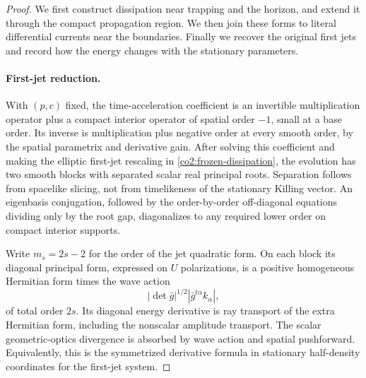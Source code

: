 \begin{proof}
We first construct dissipation near trapping and the horizon, and extend it
through the compact propagation region.  We then join these forms to literal
differential currents near the boundaries.  Finally we recover the original
first jets and record how the energy changes with the stationary parameters.

\paragraph{First-jet reduction.}
With $(p,c)$ fixed, the time-acceleration coefficient is an invertible
multiplication operator plus a compact interior operator of spatial order
$-1$, small at a base order.  Its inverse is multiplication plus negative
order at every smooth order, by the spatial parametrix and derivative gain.
After solving this coefficient and making the elliptic first-jet rescaling
in \eqref{co2:frozen-dissipation}, the evolution has two smooth blocks with
separated scalar real principal roots.  Separation follows from spacelike
slicing, not from timelikeness of the stationary Killing vector.  An
eigenbasis conjugation, followed by the order-by-order off-diagonal equations
dividing only by the root gap, diagonalizes to any required lower order on
compact interior supports.

Write $m_s=2s-2$ for the order of the jet quadratic form.  On each block its
diagonal principal form, expressed on $U$ polarizations, is a positive
homogeneous Hermitian form times the wave action
\[
 |\det\bar g|^{1/2}|\bar g^{t\alpha}k_\alpha|,
\]
of total order $2s$.  Its diagonal energy derivative is ray transport of the
extra Hermitian form, including the nonscalar amplitude transport.  The
scalar geometric-optics divergence is absorbed by wave action and spatial
pushforward.  Equivalently, this is the symmetrized derivative formula in
stationary half-density coordinates for the first-jet system.


\end{proof}
